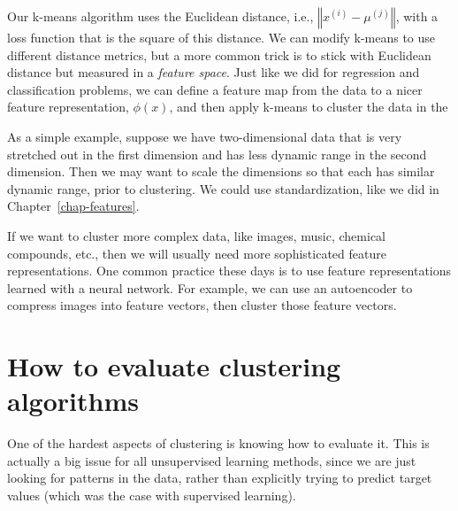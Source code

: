 Our k-means algorithm uses the Euclidean distance, i.e., $\left\Vert
  x^{(i)} - \mu^{(j)} \right\Vert$, with a loss function that is the
square of this distance. We can modify k-means to use different
distance metrics, but a more common trick is to stick with Euclidean
distance but measured in a \textit{feature space}. Just like we did
for regression and classification problems, we can define a feature
map from the data to a nicer feature representation, $\phi(x)$, and
then apply k-means to cluster the data in the

As a simple example, suppose we have two-dimensional data that is very
stretched out in the first dimension and has less dynamic range in the
second dimension. Then we may want to scale the dimensions so that
each has similar dynamic range, prior to clustering. We could use
standardization, like we did in Chapter~\ref{chap-features}.

If we want to cluster more complex data, like images, music, chemical
compounds, etc., then we will usually need more sophisticated feature
representations. One common practice these days is to use feature
representations learned with a neural network. For example, we can use
an autoencoder to compress images into feature vectors, then cluster
those feature vectors.



\section{How to evaluate clustering algorithms}
\label{sec-eval}

One of the hardest aspects of clustering is knowing how to evaluate
it. This is actually a big issue for all unsupervised learning
methods, since we are just looking for patterns in the data, rather
than explicitly trying to predict target values (which was the case
with supervised learning).

